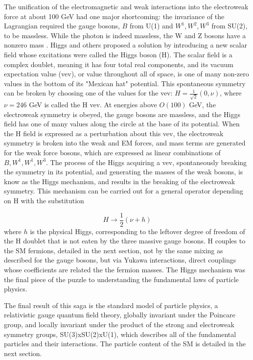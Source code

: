 \indent The unification of the electromagnetic and weak interactions into the electroweak force at about 100 GeV had one major shortcoming: the invariance of the Lagrangian required the gauge bosons, $B$ from U(1) and $W^1, W^2, W^3$ from SU(2), to be massless. While the photon is indeed massless, the W and Z bosons have a nonzero mass \cite{}. Higgs and others \cite{} proposed a solution by introducing a new scalar field whose excitations were called the Higgs boson (H). The scalar field is a complex doublet, meaning it has four total real components, and its vacuum expectation value (vev), or value throughout all of space, is one of many non-zero values in the bottom of its "Mexican hat" potential. This spontaneous symmetry can be broken by choosing one of the values for the vev: $H = \frac{1}{\sqrt{2}} (0, \nu)$, where $\nu=246$ GeV is called the H vev. At energies above $O(100)$ GeV, the electroweak symmetry is obeyed, the gauge bosons are massless, and the Higgs field has one of many values along the circle at the base of its potential. When the H field is expressed as a perturbation about this vev, the electroweak symmetry is broken into the weak and EM forces, and mass terms are generated for the weak force bosons, which are expressed as linear combinations of $B, W^1, W^1, W^3$. The process of the Higgs acquiring a vev, spontaneously breaking the symmetry in its potential, and generating the masses of the weak bosons, is know as the Higgs mechanism, and results in the breaking of the electroweak symmetry. This mechanism can be carried out for a general operator depending on H with the substitution

\begin{equation}
H \rightarrow \frac{1}{2} (\nu + h)
\end{equation}
where $h$ is the physical Higgs, corresponding to the leftover degree of freedom of the H doublet that is not eaten by the three massive gauge bosons. H couples to the SM fermions, detailed in the next section, not by the same mixing as described for the gauge bosons, but via Yukawa interactions, direct couplings whose coefficients are related the the fermion masses. The Higgs mechanism was the final piece of the puzzle to understanding the fundamental laws of particle physics.
 
\indent The final result of this saga is the standard model of particle physics, a relativistic gauge quantum field theory, globally invariant under the Poincare group, and locally invariant under the product of the strong and electroweak symmetry groups, SU(3)xSU(2)xU(1), which describes all of the fundamental particles and their interactions. The particle content of the SM is detailed in the next section.


